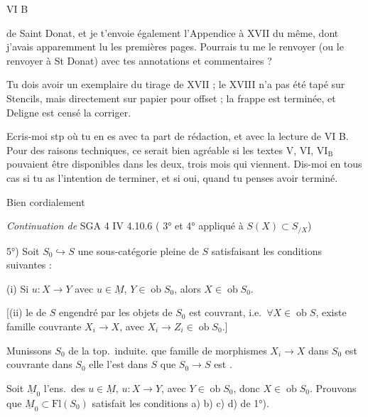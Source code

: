 \documentclass[11pt,a4paper]{article}
\begin{document}
VI B

de Saint Donat, et je t'envoie également l'Appendice à XVII du même, dont
j'avais apparemment lu les premières pages. Pourrais tu me le renvoyer (ou le
renvoyer à St Donat) avec tes annotations et commentaires ?

Tu dois avoir un exemplaire du tirage de XVII ; le XVIII n'a pas été tapé sur
Stencils, mais directement sur papier pour offset ; la frappe est terminée, et
Deligne est censé la corriger.

Ecris-moi stp où tu en es avec ta part de rédaction, et avec la lecture de VI
B. Pour des raisons techniques, ce serait bien agréable si les textes V, VI,
$\mathrm{VI}_{\mathrm{B}}$ pouvaient être disponibles dans les deux, trois mois
qui viennent. Dis-moi en tous cas si tu as l'intention de terminer, et si oui,
quand tu penses avoir terminé.

Bien cordialement


\emph{Continuation de} SGA 4 IV 4.10.6 ( 3° et 4°
appliqué à $S(X) \subset S_{/X}$)

5°) Soit $S_0 \hookrightarrow S$ une 
  sous-catégorie pleine
de $S$ satisfaisant les conditions suivantes :

(i) Si $u : X \to Y$ avec $u \in \underline{M}$, $Y \in \operatorname{ob} S_0$,
alors $X \in \operatorname{ob} S_0$.

[(ii)  \struck{\ill{} \ill{}} le  de $S$ engendré par
les objets de $S_0$ est couvrant, i.e.\ $\forall X \in \operatorname{ob} S$,
existe famille couvrante $X_i \to X$, avec $X_i \to Z_i \in \operatorname{ob}
S_0$.]

Munissons $S_0$ de la top.\ induite.  que 
famille de morphismes $X_i \to X$ dans $S_0$ est couvrante dans $S_0$
 elle l'est dans $S$ \struck{\ill{}}  que
$S_0 \to S$ est \emph{}.

Soit $\underline{M}_0$ l'ens.\ des $u \in \underline{M}$, \struck{\ill{}}
$u : X \to Y$, avec $Y \in \operatorname{ob} S_0$, donc
$X \in \operatorname{ob} S_0$. Prouvons que $\underline{M}_0 \subset
\mathrm{Fl}(S_0)$ satisfait les conditions a) b) c) d) de 1°).
\end{document}
